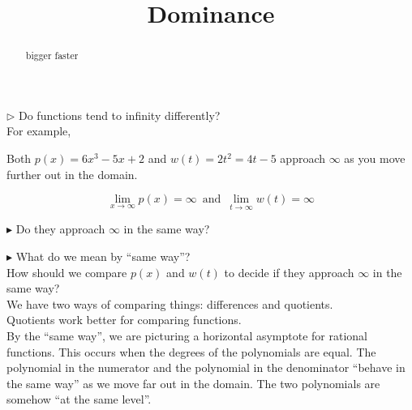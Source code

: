 \documentclass{ximera}
\title{Dominance}
\begin{document}
\begin{abstract}
bigger faster
\end{abstract}
\maketitle







\textbf{\textcolor{red!80!black}{$\rhd$}} Do functions tend to infinity differently? \\



For example,

Both $p(x) = 6x^3 - 5x + 2$ and $w(t) = 2t^2 = 4t - 5$ approach $\infty$ as you move further out in the domain.



\[    \lim_{x \to \infty} p(x) = \infty  \, \text{ and }  \,       \lim_{t \to \infty} w(t) = \infty                \]

$\blacktriangleright$ Do they approach $\infty$ in the same way? 

$\blacktriangleright$ What do we mean by ``same way''?  \\



How should we compare $p(x)$ and $w(t)$ to decide if they approach $\infty$ in the same way?  \\


We have two ways of comparing things: differences and quotients. \\

Quotients work better for comparing functions. \\


By the ``same way'', we are picturing a horizontal asymptote for rational functions. This occurs when the degrees of the polynomials are equal.   The polynomial in the numerator and the polynomial in the denominator ``behave in the same way'' as we move far out in the domain.  The two polynomials are somehow ``at the same level''. \\
\end{document}
